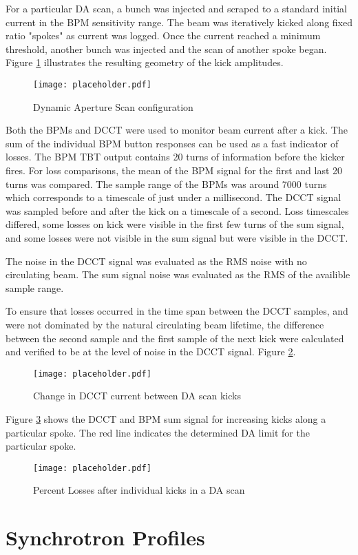 For a particular DA scan, a bunch was injected and scraped to a standard initial current in the BPM sensitivity range. The beam was iteratively kicked along fixed ratio "spokes" as current was logged. Once the current reached a minimum threshold, another bunch was injected and the scan of another spoke began.  Figure \ref{fig:spokes} illustrates the resulting geometry of the kick amplitudes.

\begin{figure}
	\centering
	\texttt{[image: placeholder.pdf]}
	\caption{Dynamic Aperture Scan configuration}
	\label{fig:spokes}
\end{figure}

Both the BPMs and DCCT were used to monitor beam current after a kick. The sum of the individual BPM button responses can be used as a fast indicator of losses. The BPM TBT output contains 20 turns of information before the kicker fires. For loss comparisons, the mean of the BPM signal for the first and last 20 turns was compared. The sample range of the BPMs was around 7000 turns which corresponds to a timescale of just under a millisecond. The DCCT signal was sampled before and after the kick on a timescale of a second. Loss timescales differed, some losses on kick were visible in the first few turns of the sum signal, and some losses were not visible in the sum signal but were visible in the DCCT. 

The noise in the DCCT signal was evaluated as the RMS noise with no circulating beam. The sum signal noise was evaluated as the RMS of the availible sample range.

To ensure that losses occurred in the time span between the DCCT samples, and were not dominated by the natural circulating beam lifetime, the difference between the second sample and the first sample of the next kick were calculated and verified to be at the level of noise in the DCCT signal. Figure \ref{fig:dcctKickLife}.


\begin{figure}
	\centering
	\texttt{[image: placeholder.pdf]}
	\caption{Change in DCCT current between DA scan kicks}
	\label{fig:dcctKickLife}
\end{figure}

Figure \ref{fig:daLimit} shows the DCCT and BPM sum signal for increasing kicks along a particular spoke. The red line indicates the determined DA limit for the particular spoke.

\begin{figure}
	\centering
	\texttt{[image: placeholder.pdf]}
	\caption{Percent Losses after individual kicks in a DA scan}
	\label{fig:daLimit}
\end{figure}

\section{Synchrotron Profiles} \label{sec:synchProfiles}
